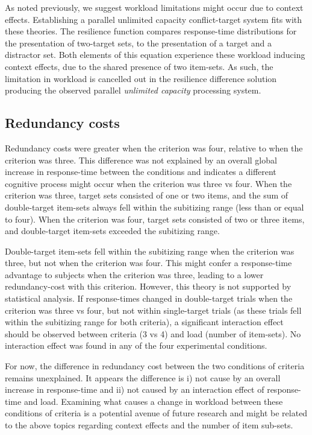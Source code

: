 As noted previously, we suggest workload limitations might 
occur due to context effects. Establishing a parallel unlimited capacity conflict-target system fits with these theories. The resilience function compares response-time distributions for the presentation of two-target sets, to the presentation of a target and a distractor set. Both elements of this equation experience these workload inducing context effects, due to the shared presence of two item-sets. As such, the limitation in workload is cancelled out in the resilience difference solution producing the observed parallel \textit{unlimited capacity} processing system.

\subsection{Redundancy costs}
Redundancy costs were greater when the criterion was four, relative to when the criterion was three. This difference was not explained by an overall global increase in response-time between the conditions and indicates a different cognitive process might occur when the criterion was three vs four. When the criterion was three, target sets consisted of one or two items, and the sum of double-target item-sets always fell within the subitizing range (less than or equal to four).  When the criterion was four, target sets consisted of two or three items, and double-target item-sets exceeded the subitizing range. 

Double-target item-sets fell within the subitizing range when the criterion was three, but not when the criterion was four. This might confer a response-time advantage to subjects when the criterion was three, leading to a lower redundancy-cost with this criterion. However, this theory is not supported by statistical analysis. If response-times changed in double-target trials when the criterion was three vs four, but not within single-target trials (as these trials fell within the subitizing range for both criteria), a significant interaction effect should be observed between criteria (3 vs 4) and load (number of item-sets). No interaction effect was found in any of the four experimental conditions. 

For now, the difference in redundancy cost between the two conditions of criteria remains unexplained. It appears the difference is i) not cause by an overall increase in response-time and ii) not caused by an interaction effect of response-time and load. Examining what causes a change in workload between these conditions of criteria is a potential avenue of future research and might be related to the above topics regarding context effects and the number of item sub-sets.

